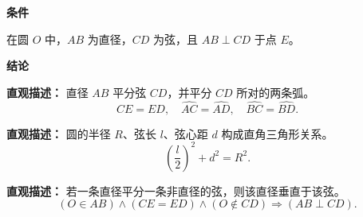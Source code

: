 \begin{statementbox}

	\textbf{\textcolor{CStatement}{条件}}
	\begin{description}[style=nextline, leftmargin=2.8em, labelsep=0.5em, itemsep=0.35em]
		\item[\textbf{\textcolor{CStatement}{条件1（直径垂直弦）：}}] 在圆 $O$ 中，$AB$ 为直径，$CD$ 为弦，且 $AB \perp CD$ 于点 $E$。
	\end{description}

	\textbf{\textcolor{CStatement}{结论}}
	\begin{description}[style=nextline, leftmargin=2.8em, labelsep=0.5em, itemsep=0.45em]
		\item[\textbf{\textcolor{CStatement}{结论一（垂直平分弦与弧）：}}]
			\textbf{\textcolor{CStatement}{直观描述：}}
			直径 $AB$ 平分弦 $CD$，并平分 $CD$ 所对的两条弧。
			\[
				CE = ED,\quad \widehat{AC} = \widehat{AD},\quad \widehat{BC} = \widehat{BD}.
			\]

		\item[\textbf{\textcolor{CStatement}{结论二（弦长公式链）：}}]
			\textbf{\textcolor{CStatement}{直观描述：}}
			圆的半径 $R$、弦长 $l$、弦心距 $d$ 构成直角三角形关系。
			\[
				\left(\frac{l}{2}\right)^2 + d^2 = R^2.
			\]

		\item[\textbf{\textcolor{CStatement}{推广结论（逆定理）：}}]
			\textbf{\textcolor{CStatement}{直观描述：}}
			若一条直径平分一条非直径的弦，则该直径垂直于该弦。
			\[
				(O\in AB) \land (CE=ED) \land (O\notin CD) \Longrightarrow (AB \perp CD).
			\]
	\end{description}

\end{statementbox}
